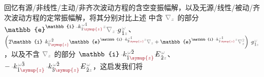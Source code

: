 回忆有源/非线性/主动/非齐次波动方程的含空变振幅解，以及无源/线性/被动/齐次波动方程的定常振幅解，将其分别对比上述  中含 $\mathcolor{gray}{\nabla_z}$ 的部分 $\mathbb{e}^{\mathbb{i} \Xint{\begin{smallmatrix} ~ \\ {}^{}_{\mathcolor{gray}{-}} \\ ~ \end{smallmatrix}}{15}{k}_{\hat{1} \textcolor{Maroon}{\symup{z}}}^{\;\! \mathcolor{gray}{\omega} \breve{1}} \mathcolor{gray}{z}} \mathcolor{gray}{\nabla_z} \Xint{{}^{}_{\mathcolor{gray}{-}}}{10}{g}^{\;\!\mathcolor{gray}{\omega}}_{\;\! \breve{1} \mathcolor{gray}{z}}$、$\left( 2 \mathbb{i} \Xint{\begin{smallmatrix} ~ \\ {}^{}_{\mathcolor{gray}{-}} \\ ~ \end{smallmatrix}}{15}{k}_{\hat{1} \textcolor{Maroon}{\symup{z}}}^{\;\! \mathcolor{gray}{\omega} \breve{2}} \mathbb{e}^{\mathbb{i} \Xint{\begin{smallmatrix} ~ \\ {}^{}_{\mathcolor{gray}{-}} \\ ~ \end{smallmatrix}}{15}{k}_{\breve{2} \textcolor{Maroon}{\symup{z}}}^{\;\! \mathcolor{gray}{\omega} \breve{1}} \mathcolor{gray}{z}} \mathcolor{gray}{\nabla_z} + \mathbb{e}^{\mathbb{i} \Xint{\begin{smallmatrix} ~ \\ {}^{}_{\mathcolor{gray}{-}} \\ ~ \end{smallmatrix}}{15}{k}_{\hat{1} \textcolor{Maroon}{\symup{z}}}^{\;\! \mathcolor{gray}{\omega} \breve{1}} \mathcolor{gray}{z}} \mathcolor{gray}{\nabla_z^2} \right) \Xint{{}^{}_{\mathcolor{gray}{-}}}{10}{g}^{\;\!\mathcolor{gray}{\omega}}_{\;\! \breve{1} \mathcolor{gray}{z}}$，以及不含 $\mathcolor{gray}{\nabla_z}$ 的部分 $\mathbb{i} \Xint{\begin{smallmatrix} ~ \\ {}^{}_{\mathcolor{gray}{-}} \\ ~ \end{smallmatrix}}{15}{k}_{\hat{1} \textcolor{Maroon}{\symup{z}}}^{\;\! \mathcolor{gray}{\omega} \breve{2}} \Xint{\mathcolor{gray}{-}}{25}{E}^{\;\!\mathcolor{gray}{\omega}}_{\;\! \breve{2} \mathcolor{gray}{z}}$、$ - \Xint{\begin{smallmatrix} ~ \\ {}^{}_{\mathcolor{gray}{-}} \\ ~ \end{smallmatrix}}{15}{k}_{\hat{1} \textcolor{Maroon}{\symup{z}}}^{\;\! \mathcolor{gray}{\omega} \breve{3}} \Xint{\begin{smallmatrix} ~ \\ {}^{}_{\mathcolor{gray}{-}} \\ ~ \end{smallmatrix}}{15}{k}_{\breve{3} \textcolor{Maroon}{\symup{z}}}^{\;\! \mathcolor{gray}{\omega} \breve{2}} \Xint{\mathcolor{gray}{-}}{25}{E}^{\;\!\mathcolor{gray}{\omega}}_{\;\! \breve{2} \mathcolor{gray}{z}}$，这启发我们将 
